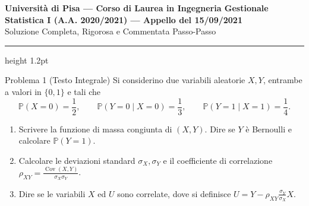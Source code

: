 \documentclass[11pt,a4paper]{article}
\newcommand{\Prob}{\mathbb{P}}
\newcommand{\Cov}{\operatorname{Cov}}
\begin{document}
\begin{center}
    {\LARGE\bfseries\color{navyblue} Università di Pisa --- Corso di Laurea in Ingegneria Gestionale}\\[0.4em]
    {\Large\bfseries Statistica I (A.A. 2020/2021) --- Appello del 15/09/2021}\\[0.3em]
    {\large\textsf{Soluzione Completa, Rigorosa e Commentata Passo-Passo}}
\end{center}
\vspace{0.5em}
\hrule height 1.2pt
\vspace{1.5em}

\begin{problemabox}{Problema 1 (Testo Integrale)}
Si considerino due variabili aleatorie $X, Y$, entrambe a valori in $\{0,1\}$ e tali che
\[
\Prob(X = 0) = \frac{1}{2}, \qquad \Prob(Y = 0 \mid X = 0) = \frac{1}{3}, \qquad \Prob(Y = 1 \mid X = 1) = \frac{1}{4}.
\]
\begin{enumerate}
    \item Scrivere la funzione di massa congiunta di $(X,Y)$. Dire se $Y$ è Bernoulli e calcolare $\Prob(Y = 1)$.
    \item Calcolare le deviazioni standard $\sigma_X, \sigma_Y$ e il coefficiente di correlazione $\rho_{XY} = \frac{\Cov(X,Y)}{\sigma_X \sigma_Y}$.
    \item Dire se le variabili $X$ ed $U$ sono correlate, dove si definisce $U = Y - \rho_{XY}\frac{\sigma_Y}{\sigma_X}X$.
\end{enumerate}
\end{problemabox}
\end{document}
